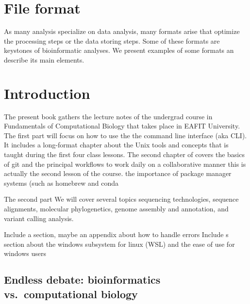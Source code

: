 \documentclass[
  letterpaper,
  DIV=11,
  numbers=noendperiod,
  oneside]{scrreprt}
\begin{document}
\begin{tcolorbox}[enhanced jigsaw, colback=white, opacityback=0, leftrule=.75mm, breakable, colframe=quarto-callout-color-frame, rightrule=.15mm, arc=.35mm, bottomrule=.15mm, toprule=.15mm, left=2mm]


\hypertarget{file-format}{%
\chapter*{File format}\label{file-format}}

As many analysis specialize on data analysis, many formats arise that
optimize the processing steps or the data storing steps. Some of these
formats are keystones of bioinformatic analyses. We present examples of
some formats an describe its main elements.

\end{tcolorbox}


\hypertarget{introduction}{%
\chapter*{Introduction}\label{introduction}}

The present book gathers the lecture notes of the undergrad course in
Fundamentals of Computational Biology that takes place in EAFIT
University. The first part will focus on how to use the the command line
interface (aka CLI). It includes a long-format chapter about the Unix
tools and concepts that is taught during the first four class lessons.
The second chapter of covers the basics of git and the principal
workflows to work daily on a collaborative manner this is actually the
second lesson of the course. the importance of package manager systems
(such as homebrew and conda

The second part We will cover several topics sequencing technologies,
sequence alignments, molecular phylogenetics, genome assembly and
annotation, and variant calling analysis.

Include a section, maybe an appendix about how to handle errors Include
s section about the windows subsystem for linux (WSL) and the ease of
use for windows users

\hypertarget{endless-debate-bioinformatics-vs.-computational-biology}{%
\section*{Endless debate: bioinformatics vs.~computational
biology}\label{endless-debate-bioinformatics-vs.-computational-biology}}
\end{document}
